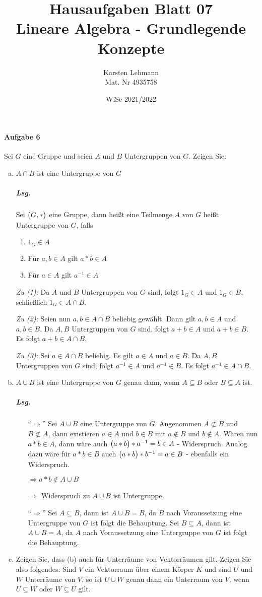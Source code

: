 \documentclass{scrreprt}
\author{Karsten Lehmann\\Mat. Nr 4935758}
\date{WiSe 2021/2022}
\title{Hausaufgaben Blatt 07\\Lineare Algebra - Grundlegende Konzepte}
\begin{document}
\paragraph{Aufgabe 6}
Sei $G$ eine Gruppe und seien $A$ und $B$ Untergruppen von $G$.
Zeigen Sie:
\begin{enumerate}[(a)]
\item $A \cap B$ ist eine Untergruppe von $G$

  \subparagraph{Lsg.} Sei $\qty\big(G, *)$ eine Gruppe, dann heißt eine
  Teilmenge $A$ von $G$ heißt Untergruppe von $G$, falls
  \begin{enumerate}[(1)]
  \item $1_G \in A$
  \item Für $a, b \in A$ gilt $a * b \in A$
  \item Für $a \in A$ gilt $a^{-1} \in A$
  \end{enumerate}

  \emph{Zu (1):} Da $A$ und $B$ Untergruppen von $G$ sind, folgt $1_G \in A$ und
  $1_G \in B$, schließlich $1_G \in A \cap B$.

  \emph{Zu (2):} Seien nun $a, b \in A \cap B$ beliebig gewählt.
  Dann gilt $a, b \in A$ und $a, b \in B$.
  Da $A, B$ Untergruppen von $G$ sind, folgt $a + b \in A$ und $a + b \in B$.
  Es folgt $a + b \in A \cap B$.

  \emph{Zu (3):} Sei $a \in A \cap B$ beliebig.
  Es gilt $a \in A$ und $a \in B$.
  Da $A, B$ Untergruppen von $G$ sind, folgt $a^{-1} \in A$ und $a^{-1} \in B$.
  Es folgt $a^{-1} \in A \cap B$.

\item $A \cup B$ ist eine Untergruppe von $G$ genau dann, wenn
  $A \subseteq B$ oder $B \subseteq A$ ist.

  \subparagraph{Lsg.}
  \begin{itemize}
  \item[``$\Rightarrow$''] Sei $A \cup B$ eine Untergruppe von $G$.
    Angenommen $A \not\subset B$ und $B \not\subset A$, dann existieren
    $a \in A$ und $b \in B$ mit $a \notin B$ und $b \notin A$.
    Wären nun $a * b \in A$, dann wäre auch $\qty\big(a * b) * a^{-1} = b \in A$
    - Widerspruch.
    Analog dazu wäre für $a * b \in B$ auch $\qty\big(a * b) * b^{-1} = a \in B$
    - ebenfalls ein Widerspruch.

    $\Rightarrow a * b \not \in A \cup B$

    $\Rightarrow$ Widerspruch zu $A \cup B$ ist Untergruppe.

  \item[``$\Rightarrow$''] Sei $A \subseteq B$, dann ist $A \cup B = B$,
    da $B$ nach Voraussetzung eine Untergruppe von $G$ ist folgt die
    Behauptung.
    Sei $B \subseteq A$, dann ist $A \cup B = A$,
    da $A$ nach Voraussetzung eine Untergruppe von $G$ ist folgt die
    Behauptung.
  \end{itemize}

\item Zeigen Sie, dass (b) auch für Unterräume von Vektorräumen gilt.
  Zeigen Sie also folgendes: Sind $V$ ein Vektorraum über einem Körper $K$
  und sind $U$ und $W$ Unterräume von $V$, so ist $U \cup W$ genau dann ein
  Unterraum von $V$, wenn $U \subseteq W$ oder $W \subseteq U$ gilt.
\end{enumerate}
\end{document}
